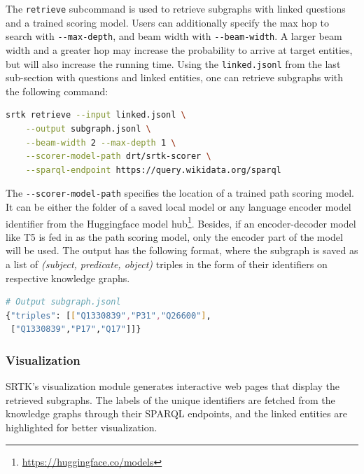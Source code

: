 \documentclass[runningheads]{llncs}
\begin{document}


The \texttt{retrieve} subcommand is used to retrieve subgraphs with linked questions and a trained scoring model. Users can additionally specify the max hop to search with \texttt{-{}-max-depth}, and beam width with \texttt{-{}-beam-width}. A larger beam width and a greater hop may increase the probability to arrive at target entities, but will also increase the running time. Using the \texttt{linked.jsonl} from the last sub-section with questions and linked entities, one can retrieve subgraphs with the following command:

\begin{lstlisting}[language=bash]
srtk retrieve --input linked.jsonl \
    --output subgraph.jsonl \
    --beam-width 2 --max-depth 1 \
    --scorer-model-path drt/srtk-scorer \
    --sparql-endpoint https://query.wikidata.org/sparql
\end{lstlisting}

The \texttt{-{}-scorer-model-path} specifies the location of a trained path scoring model. It can be either the folder of a saved local model or any language encoder model identifier from the Huggingface model hub\footnote{\url{https://huggingface.co/models}}. Besides, if an encoder-decoder model like T5 \cite{raffel2020t5} is fed in as the path scoring model, only the encoder part of the model will be used. The output has the following format, where the subgraph is saved as a list of \textit{(subject, predicate, object)} triples in the form of their identifiers on respective knowledge graphs.

\begin{lstlisting}[language=bash]
# Output subgraph.jsonl
{"triples": [["Q1330839","P31","Q26600"],
 ["Q1330839","P17","Q17"]]}
\end{lstlisting}

\subsubsection{Visualization}

SRTK's visualization module generates interactive web pages that display the retrieved subgraphs. The labels of the unique identifiers are fetched from the knowledge graphs through their SPARQL endpoints, and the linked entities are highlighted for better visualization. 
\end{document}
